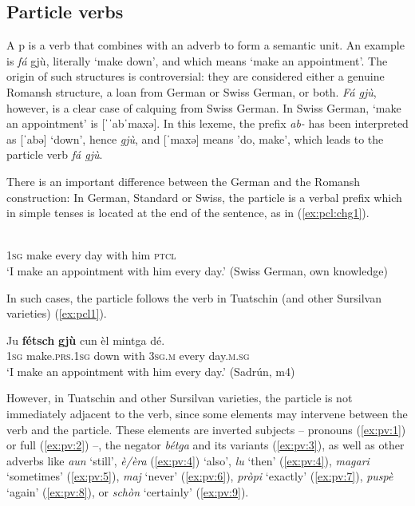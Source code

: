 \subsection{Particle verbs}\label{sec:4.1.3}
A p is a verb that combines with an adverb to form a semantic unit. An example is \textit{fá} gjù, literally `make down', and which means `make an appointment'. The origin of such structures is controversial: they are considered either a genuine Romansh structure, a loan from German or Swiss German, or both. \textit{Fá gjù}, however, is a clear case of calquing from Swiss German. In Swiss German, `make an appointment' is [ˈˈabˈmaxə]. In this lexeme, the prefix \textit{ab-} has been interpreted as [ˈabə] `down', hence \textit{gjù}, and [ˈmaxə] means 'do, make', which leads to the particle verb \textit{fá gjù}.

There is an important difference between the German and the Romansh construction: In German, Standard or Swiss, the particle is a verbal prefix which in simple tenses is located at the end of the sentence, as in (\ref{ex:pcl:chg1}).

\ea\label{ex:pcl:chg1}
\\
     \textsc{1sg}  make every day with him  \textsc{ptcl} \\
\glt `I make an appointment with him every day.' (Swiss German, own knowledge)
\z

In such cases, the particle follows the verb in Tuatschin (and other Sursilvan varieties) (\ref{ex:pcl1}).

\ea\label{ex:pcl1}
\gll  Ju \textbf{fétsch} \textbf{gjù} cun èl mintga dé.\\
     \textsc{1sg}  make.\textsc{prs.1sg}  down with \textsc{3sg.m}  every day.\textsc{m.sg}\\
\glt `I make an appointment with him every day.' (Sadrún, m4)
\z

However, in Tuatschin and other Sursilvan varieties, the particle is not immediately adjacent to the verb, since some elements may intervene between the verb and the particle. These elements are inverted subjects -- pronouns (\ref{ex:pv:1}) or full  (\ref{ex:pv:2}) --, the negator \textit{bétga} and its variants (\ref{ex:pv:3}), as well as other adverbs like \textit{aun} `still', \textit{è/èra} (\ref{ex:pv:4}) `also', \textit{lu} `then' (\ref{ex:pv:4}), \textit{magari} `sometimes' (\ref{ex:pv:5}), \textit{maj} `never' (\ref{ex:pv:6}), \textit{pròpi} `exactly' (\ref{ex:pv:7}), \textit{puspè} `again' (\ref{ex:pv:8}), or \textit{schòn} `certainly' (\ref{ex:pv:9}).

